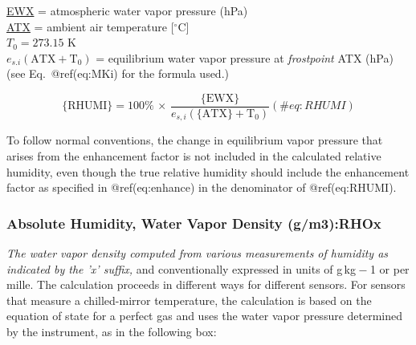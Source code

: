 \documentclass[
  english,
]{book}
\begin{document}
\protect\hyperlink{ewx}{EWX} = atmospheric water vapor pressure (hPa)\\
\protect\hyperlink{ambient-t}{ATX} = ambient air temperature
{[}\(^{\circ}\mathrm{C}\){]}\\
\(T_{0}=273.15\) K\\
\(e_{s.i}(\mathrm{ATX+T_{0}})\) = equilibrium water vapor pressure at
\emph{frostpoint} ATX (hPa)\\
\hspace*{0.333em}\hspace*{0.333em}\hspace*{0.333em}\hspace*{0.333em}\hspace*{0.333em}\hspace*{0.333em}\hspace*{0.333em}\hspace*{0.333em}\hspace*{0.333em}\hspace*{0.333em}(see
Eq.~@ref(eq:MKi) for the formula used.)

\begin{equation}
\mathrm{\{RHUMI\}}=100\%\,\times\,\frac{\mathrm{\{EWX\}}}{e_{s,i}(\mathrm{\{ATX\}+T_{0}})}
(\#eq:RHUMI)
\end{equation}

To follow normal conventions, the change in equilibrium vapor pressure
that arises from the enhancement factor is not included in the
calculated relative humidity, even though the true relative humidity
should include the enhancement factor as specified in @ref(eq:enhance)
in the denominator of @ref(eq:RHUMI).

\hypertarget{rho}{%
\subsubsection*{\texorpdfstring{Absolute Humidity, Water Vapor Density
(g/m{3}):RHOx}{Absolute Humidity, Water Vapor Density (g/m3):RHOx}}\label{rho}}

\emph{The water vapor density computed from various measurements of
humidity as indicated by the 'x' suffix,} and conventionally expressed
in units of g kg{ − 1} or per mille. The calculation proceeds in
different ways for different sensors. For sensors that measure a
chilled-mirror temperature, the calculation is based on the equation of
state for a perfect gas and uses the water vapor pressure determined by
the instrument, as in the following box:
\end{document}
